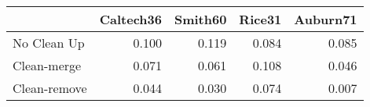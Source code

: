 \begin{tabular}{lrrrr}
\toprule
{} & Caltech36 & Smith60 & Rice31 & Auburn71 \\
\midrule
No Clean Up  &     0.100 &   0.119 &  0.084 &    0.085 \\
Clean-merge  &     0.071 &   0.061 &  0.108 &    0.046 \\
Clean-remove &     0.044 &   0.030 &  0.074 &    0.007 \\
\bottomrule
\end{tabular}
